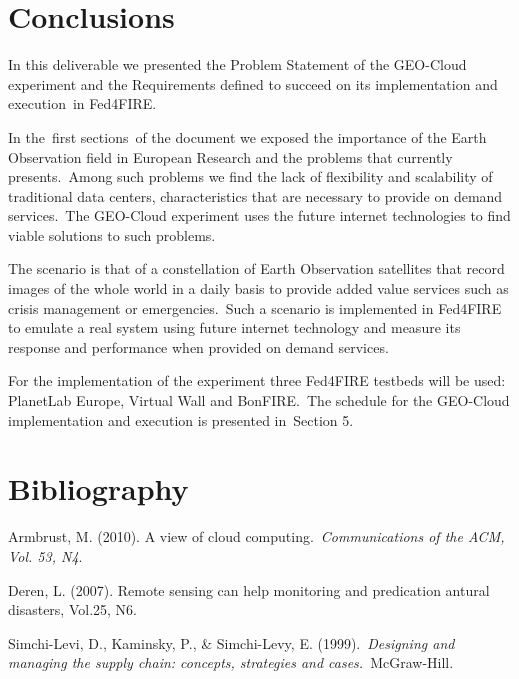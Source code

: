\documentclass[a4paper]{article}
\begin{document}
\section[Conclusions]{Conclusions}
\hypertarget{Toc378868694}{}
\bigskip

In this deliverable we presented the Problem Statement of the GEO-Cloud
experiment and the Requirements defined to succeed on its
implementation and execution\ in Fed4FIRE.


\bigskip

In the\ first sections\ of the document we exposed the importance of the
Earth Observation field in European Research and the problems that
currently presents.\ Among such problems we find the lack of
flexibility and scalability of traditional data centers,
characteristics that are necessary to provide on demand services.\ The
GEO-Cloud experiment uses the future internet technologies to find
viable solutions to such problems.


\bigskip

The scenario is that of a constellation of Earth Observation satellites
that record images of the whole world in a daily basis to provide added
value services such as crisis management or emergencies.\ Such a
scenario is implemented in Fed4FIRE to emulate a real system using
future internet technology and measure its response and performance
when provided on demand services.\ 


\bigskip

For the implementation of the experiment three Fed4FIRE testbeds will be
used: PlanetLab Europe, Virtual Wall and BonFIRE.\ The schedule for the
GEO-Cloud implementation and execution is presented in\ Section 5.


\bigskip


\bigskip


\bigskip


\bigskip

\section{Bibliography}

\bigskip

Armbrust, M. (2010). A view of cloud computing.\ \textit{Communications
of the ACM, Vol. 53, N4}.

Deren, L. (2007). Remote sensing can help monitoring and predication
antural disasters, Vol.25, N6.

Simchi-Levi, D., Kaminsky, P., \& Simchi-Levy, E.
(1999).\ \textit{Designing and managing the supply chain: concepts,
strategies and cases.}\ McGraw-Hill.


\bigskip


\bigskip


\bigskip
\end{document}
